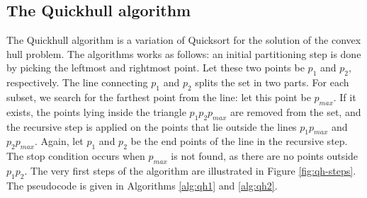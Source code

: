 \documentclass[]{finalproject}
\begin{document}
\subsection{The Quickhull algorithm}
The Quickhull algorithm is a variation of Quicksort for the solution of the convex hull problem.
The algorithms works as follows:
an initial partitioning step is done by picking the leftmost and rightmost point.
Let these two points be $p_1$ and $p_2$, respectively.
The line connecting $p_1$ and $p_2$ splits the set in two parts.
For each subset, we search for the farthest point from the line: let this point be $p_{max}$.
If it exists, the points lying inside the triangle $p_1p_2p_{max}$ are removed from the set,
and the recursive step is applied on the points that lie outside the lines $p_1p_{max}$ and $p_2p_{max}$.
Again, let $p_1$ and $p_2$ be the end points of the line in the recursive step.
The stop condition occurs when $p_{max}$ is not found, as there are no points outside $p_1p_2$.
The very first steps of the algorithm are illustrated in Figure \ref{fig:qh-steps}.
The pseudocode is given in Algorithms \ref{alg:qh1} and \ref{alg:qh2}.
\end{document}
